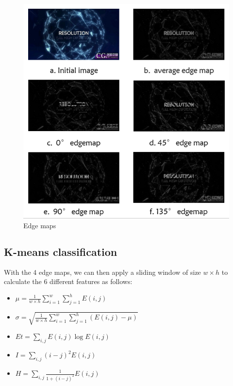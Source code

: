 \documentclass[paper=a4, french, 11pt]{scrartcl}
\begin{document}
\begin{figure}[h]
\begin{center}
	\vspace{-1ex}
   \includegraphics[width=0.75\linewidth]{edge_filter_example.png}
\end{center}
\vspace{-4ex}
\caption{Edge maps}
\label{fig:heatmap}
\end{figure}

\subsection{K-means classification}
With the 4 edge maps, we can then apply a sliding window of size $w \times h$ to calculate the 6 different features as follows:

\begin{itemize}
\item $\mu = \frac{1}{w \times h} \sum_{i=1}^{w} \sum_{j=1}^{h} E(i,j)$

\item $\sigma =\sqrt{\frac{1}{w \times h} \sum_{i=1}^{w} \sum_{j=1}^{h} (E(i,j) - \mu)}$

\item $ Et = \sum_{i,j} E(i,j)\log E(i,j) $

\item $ I = \sum_{i,j} (i-j)^2 E(i,j)$

\item $ H = \sum_{i,j} \frac{1}{1+(i-j)^2}E(i,j)$
\end{itemize}
\end{document}
